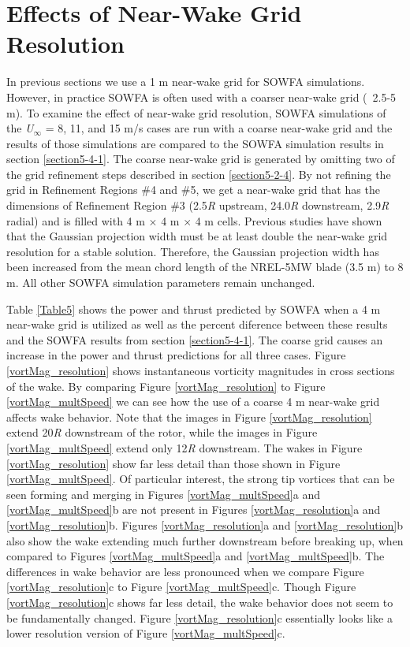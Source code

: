
\section{Effects of Near-Wake Grid Resolution}\label{section5-4-3}
In previous sections we use a 1 m near-wake grid for SOWFA simulations. However, in practice SOWFA is often used with a coarser near-wake grid (~2.5-5 m).\cite{lee2012,fleming2014,archer2013,mache2014} To examine the effect of near-wake grid resolution, SOWFA simulations of the \emph{U$_\infty$} = 8, 11, and 15  m/s cases are run with a coarse near-wake grid and the results of those simulations are compared to the SOWFA simulation results in section  \ref{section5-4-1}. The coarse near-wake grid is generated by omitting two of the grid refinement steps described in section \ref{section5-2-4}. By not refining the grid in Refinement Regions \#4 and \#5, we get a near-wake grid that has the dimensions of Refinement Region \#3 (2.5\emph{R} upstream, 24.0\emph{R} downstream, 2.9\emph{R} radial) and is filled with 4 m $\times$ 4 m $\times$ 4 m cells.   Previous studies have shown that the Gaussian projection width must be at least double the near-wake grid resolution for a stable solution.\cite{churchfield2012,martinez2012}  Therefore, the Gaussian projection width has been increased from the mean chord length of the NREL-5MW blade (3.5 m) to 8 m. All other SOWFA simulation parameters remain unchanged.

Table \ref{Table5} shows the power and thrust predicted by SOWFA when a 4 m near-wake grid is utilized as well as the percent diference between these results and the SOWFA results from section   \ref{section5-4-1}. The coarse grid causes an increase in the power and thrust predictions for all three cases.  Figure \ref{vortMag_resolution} shows instantaneous vorticity magnitudes in cross sections of the wake. By comparing Figure \ref{vortMag_resolution} to Figure \ref{vortMag_multSpeed} we can see how the use of a coarse 4 m near-wake grid affects wake behavior. Note that the images in Figure \ref{vortMag_resolution} extend 20\emph{R} downstream of the rotor, while the images in Figure \ref{vortMag_multSpeed} extend only 12\emph{R} downstream. The wakes in Figure \ref{vortMag_resolution} show far less detail than those shown in Figure \ref{vortMag_multSpeed}. Of particular interest, the strong tip vortices that can be seen forming and merging in Figures \ref{vortMag_multSpeed}a and \ref{vortMag_multSpeed}b are not present in Figures \ref{vortMag_resolution}a and \ref{vortMag_resolution}b. Figures \ref{vortMag_resolution}a and \ref{vortMag_resolution}b also show the wake extending much further downstream before breaking up, when compared to Figures \ref{vortMag_multSpeed}a and \ref{vortMag_multSpeed}b. The differences in wake behavior are less pronounced when we compare Figure \ref{vortMag_resolution}c to Figure \ref{vortMag_multSpeed}c. Though  Figure \ref{vortMag_resolution}c shows far less detail, the wake behavior does not seem to be fundamentally changed. Figure \ref{vortMag_resolution}c essentially looks like a lower resolution version of Figure \ref{vortMag_multSpeed}c.
 
